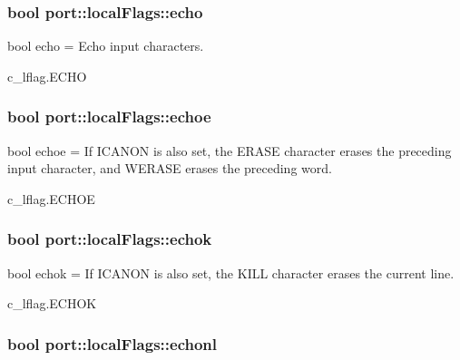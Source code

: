 \subsubsection[{\texorpdfstring{echo}{echo}}]{\setlength{\rightskip}{0pt plus 5cm}bool port\+::local\+Flags\+::echo}\hypertarget{classport_1_1localFlags_a2c231fce7fa4a5ec4125af1d1ae31da5}{}\label{classport_1_1localFlags_a2c231fce7fa4a5ec4125af1d1ae31da5}


bool echo = Echo input characters. 

c\+\_\+lflag.\+E\+C\+HO
\subsubsection[{\texorpdfstring{echoe}{echoe}}]{\setlength{\rightskip}{0pt plus 5cm}bool port\+::local\+Flags\+::echoe}\hypertarget{classport_1_1localFlags_aaf0665b2b3f32a5c423924acdc26c0bf}{}\label{classport_1_1localFlags_aaf0665b2b3f32a5c423924acdc26c0bf}


bool echoe = If I\+C\+A\+N\+ON is also set, the E\+R\+A\+SE character erases the preceding input character, and W\+E\+R\+A\+SE erases the preceding word. 

c\+\_\+lflag.\+E\+C\+H\+OE
\subsubsection[{\texorpdfstring{echok}{echok}}]{\setlength{\rightskip}{0pt plus 5cm}bool port\+::local\+Flags\+::echok}\hypertarget{classport_1_1localFlags_ac68cbd1d58782fb5bc27ba85af026c30}{}\label{classport_1_1localFlags_ac68cbd1d58782fb5bc27ba85af026c30}


bool echok = If I\+C\+A\+N\+ON is also set, the K\+I\+LL character erases the current line. 

c\+\_\+lflag.\+E\+C\+H\+OK
\subsubsection[{\texorpdfstring{echonl}{echonl}}]{\setlength{\rightskip}{0pt plus 5cm}bool port\+::local\+Flags\+::echonl}\hypertarget{classport_1_1localFlags_a2a27e1978747d34ee03ea71ca0af2818}{}\label{classport_1_1localFlags_a2a27e1978747d34ee03ea71ca0af2818}


